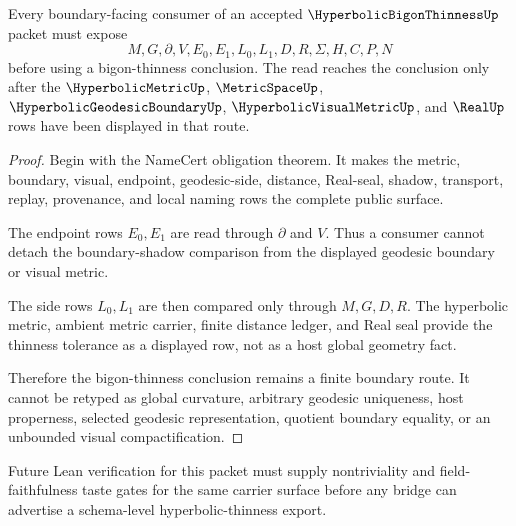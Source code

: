 \begin{theorem}\label{thm:hyperbolic-bigon-thinness-boundary-route}
Every boundary-facing consumer of an accepted $\HyperbolicBigonThinnessUp$ packet must expose
$$
M,G,\partial,V,E_0,E_1,L_0,L_1,D,R,\Sigma,H,C,P,N
$$
before using a bigon-thinness conclusion. The read reaches the conclusion only after the $\HyperbolicMetricUp$, $\MetricSpaceUp$, $\HyperbolicGeodesicBoundaryUp$, $\HyperbolicVisualMetricUp$, and $\RealUp$ rows have been displayed in that route.
\end{theorem}
\begin{proof}
Begin with the NameCert obligation theorem. It makes the metric, boundary, visual, endpoint, geodesic-side, distance, Real-seal, shadow, transport, replay, provenance, and local naming rows the complete public surface.

The endpoint rows $E_0,E_1$ are read through $\partial$ and $V$. Thus a consumer cannot detach the boundary-shadow comparison from the displayed geodesic boundary or visual metric.

The side rows $L_0,L_1$ are then compared only through $M,G,D,R$. The hyperbolic metric, ambient metric carrier, finite distance ledger, and Real seal provide the thinness tolerance as a displayed row, not as a host global geometry fact.

Therefore the bigon-thinness conclusion remains a finite boundary route. It cannot be retyped as global curvature, arbitrary geodesic uniqueness, host properness, selected geodesic representation, quotient boundary equality, or an unbounded visual compactification.
\end{proof}



Future Lean verification for this packet must supply nontriviality and field-faithfulness taste gates for the same carrier surface before any bridge can advertise a schema-level hyperbolic-thinness export.


